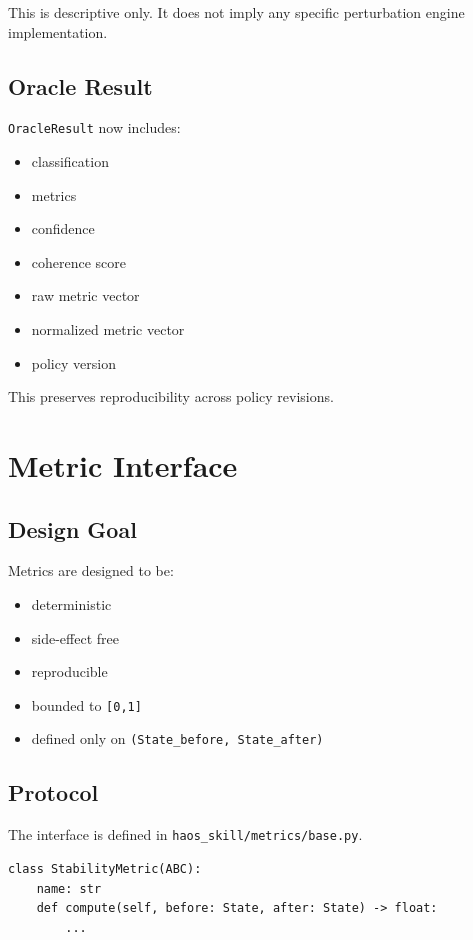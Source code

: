 \documentclass[11pt]{article}
\begin{document}
This is descriptive only.
It does not imply any specific perturbation engine implementation.

\subsection{Oracle Result}

\texttt{OracleResult} now includes:

\begin{itemize}
\item classification
\item metrics
\item confidence
\item coherence score
\item raw metric vector
\item normalized metric vector
\item policy version
\end{itemize}

This preserves reproducibility across policy revisions.

\section{Metric Interface}

\subsection{Design Goal}

Metrics are designed to be:

\begin{itemize}
\item deterministic
\item side-effect free
\item reproducible
\item bounded to \texttt{[0,1]}
\item defined only on \texttt{(State\_before, State\_after)}
\end{itemize}

\subsection{Protocol}

The interface is defined in \texttt{haos\_skill/metrics/base.py}.

\begin{verbatim}
class StabilityMetric(ABC):
    name: str
    def compute(self, before: State, after: State) -> float:
        ...
\end{verbatim}
\end{document}

